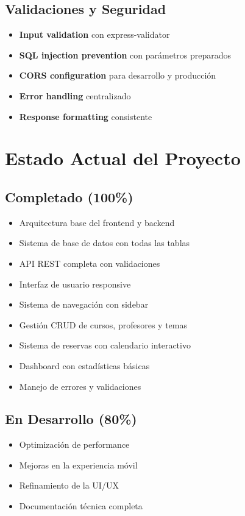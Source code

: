 \documentclass[12pt,a4paper]{article}
\begin{document}
\subsection{Validaciones y Seguridad}
\begin{itemize}
    \item \textbf{Input validation} con express-validator
    \item \textbf{SQL injection prevention} con parámetros preparados
    \item \textbf{CORS configuration} para desarrollo y producción
    \item \textbf{Error handling} centralizado
    \item \textbf{Response formatting} consistente
\end{itemize}

\section{Estado Actual del Proyecto}

\subsection{Completado (100\%)}
\begin{itemize}
    \item Arquitectura base del frontend y backend
    \item Sistema de base de datos con todas las tablas
    \item API REST completa con validaciones
    \item Interfaz de usuario responsive
    \item Sistema de navegación con sidebar
    \item Gestión CRUD de cursos, profesores y temas
    \item Sistema de reservas con calendario interactivo
    \item Dashboard con estadísticas básicas
    \item Manejo de errores y validaciones
\end{itemize}

\subsection{En Desarrollo (80\%)}
\begin{itemize}
    \item Optimización de performance
    \item Mejoras en la experiencia móvil
    \item Refinamiento de la UI/UX
    \item Documentación técnica completa
\end{itemize}
\end{document}
